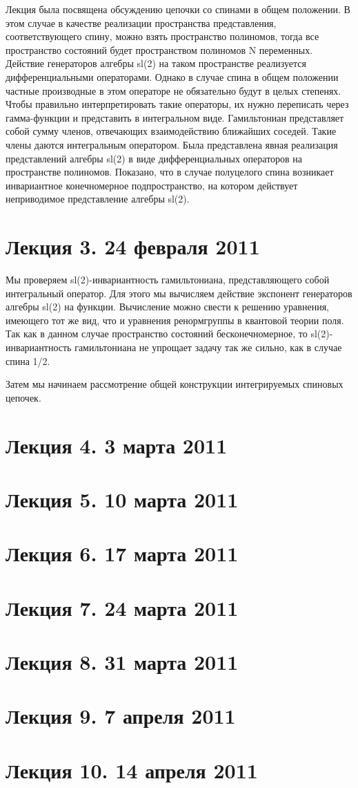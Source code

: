 \documentclass[a4paper,12pt]{article}
\theoremstyle{definition} \newtheorem{Def}{Definition}
\theoremstyle{definition} \newtheorem{Def}{Definition}
\begin{document}
Лекция была посвящена обсуждению цепочки со спинами в общем положении. В этом случае в качестве реализации пространства представления, соответствующего спину, можно взять пространство полиномов, тогда все пространство состояний будет пространством полиномов N переменных. Действие генераторов алгебры sl(2) на таком пространстве реализуется дифференциальными операторами. Однако в случае спина в общем положении частные производные в этом операторе не обязательно будут в целых степенях. Чтобы правильно интерпретировать такие операторы, их нужно переписать через гамма-функции и представить в интегральном виде.
Гамильтониан представляет собой сумму членов, отвечающих взаимодействию ближайших соседей. Такие члены даются интегральным оператором.  Была представлена явная реализация представлений алгебры sl(2) в виде дифференциальных операторов на пространстве полиномов. Показано, что в случае полуцелого спина возникает инвариантное конечномерное подпространство, на котором действует неприводимое представление алгебры sl(2).

\section{Лекция 3. 24 февраля 2011}

Мы проверяем sl(2)-инвариантность гамильтониана, представляющего собой интегральный оператор. Для этого мы вычисляем действие экспонент генераторов алгебры sl(2) на функции. Вычисление можно свести к решению уравнения, имеющего тот же вид, что и уравнения ренормгруппы в квантовой теории поля. Так как в данном случае пространство состояний бесконечномерное, то sl(2)-инвариантность гамильтониана не упрощает задачу так же сильно, как в случае спина 1/2.

Затем мы начинаем рассмотрение общей конструкции интегрируемых спиновых цепочек. 
\section{Лекция 4. 3 марта 2011}

\section{Лекция 5. 10 марта 2011}

\section{Лекция 6. 17 марта 2011}

\section{Лекция 7. 24 марта 2011}

\section{Лекция 8. 31 марта 2011}

\section{Лекция 9. 7 апреля 2011}

\section{Лекция 10. 14 апреля 2011}



{}

\end{document}
